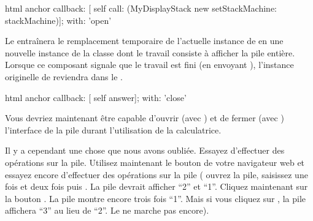 \documentclass[a4paper,10pt,twoside]{book}
\begin{document}

\begin{code}{}
html anchor
	callback: [ self call: (MyDisplayStack new setStackMachine: stackMachine)];
	with: 'open'
\end{code}

Le \callback{} entraînera le remplacement temporaire de l'actuelle
instance de  en une nouvelle instance de la classe
 dont le travail consiste à afficher la pile
entière.
Lorsque ce composant signale que le travail est fini (en envoyant
), l'instance originelle de  reviendra
dans le .



\begin{code}{}
html anchor
	callback: [ self answer];
	with: 'close'
\end{code}

Vous devriez maintenant être capable d'ouvrir (avec ) et de
fermer (avec ) l'interface  de la pile durant
l'utilisation de la calculatrice.

Il y a cependant une chose que nous avons oubliée.
Essayez d'effectuer des opérations sur la pile.
Utilisez maintenant le bouton \backbtn{} de votre navigateur web et
essayez encore d'effectuer des opérations sur la pile (\parex
ouvrez la pile, saisissez  une fois et  deux fois
puis \menu{+}. La pile devrait afficher ``2'' et ``1''. Cliquez
maintenant sur la bouton \backbtn. La pile montre encore trois fois
``1''. Mais si vous cliquez sur \menu{+}, la pile affichera ``3''
au lieu de ``2''. Le \backtracking{} ne marche pas encore).
\end{document}
